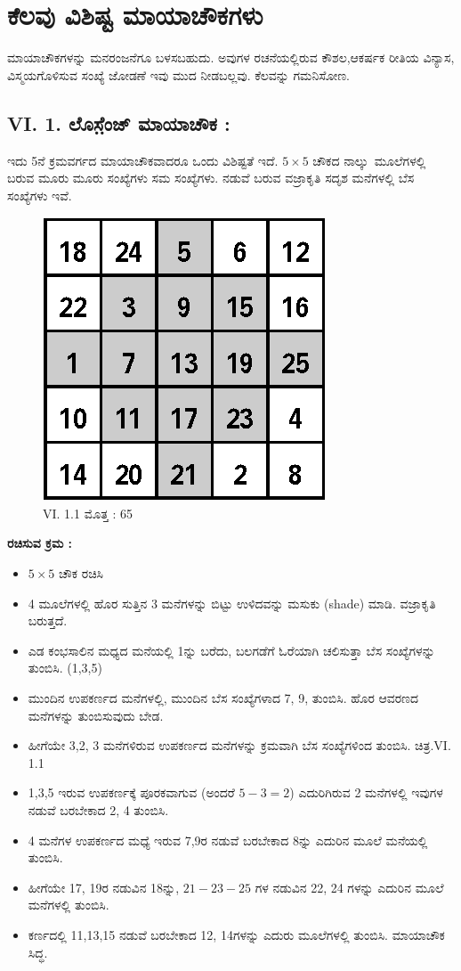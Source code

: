 
\chapter{ಕೆಲವು ವಿಶಿಷ್ಟ ಮಾಯಾಚೌಕಗಳು}

ಮಾಯಾಚೌಕಗಳನ್ನು ಮನರಂಜನೆಗೂ ಬಳಸಬಹುದು. ಅವುಗಳ ರಚನೆಯಲ್ಲಿರುವ ಕೌಶಲ,\break ಆಕರ್ಷಕ ರೀತಿಯ ವಿನ್ಯಾಸ, ವಿಸ್ಮಯಗೊಳಿಸುವ ಸಂಖ್ಯೆ ಜೋಡಣೆ ಇವು ಮುದ ನೀಡ\break ಬಲ್ಲವು. ಕೆಲವನ್ನು ಗಮನಿಸೋಣ.

\section*{VI. 1. ಲೊಸೆ಼ಂಜ್ ಮಾಯಾಚೌಕ :}

ಇದು 5ನೆ ಕ್ರಮವರ್ಗದ ಮಾಯಾಚೌಕವಾದರೂ ಒಂದು ವಿಶಿಷ್ಟತೆ ಇದೆ. $5 \times 5$ ಚೌಕದ \hbox{ನಾಲ್ಕು ಮೂಲೆಗಳಲ್ಲಿ} ಬರುವ ಮೂರು ಮೂರು ಸಂಖ್ಯೆಗಳು ಸಮ ಸಂಖ್ಯೆಗಳು. ನಡುವೆ ಬರುವ ವಜ್ರಾಕೃತಿ ಸದೃಶ ಮನೆಗಳಲ್ಲಿ ಬೆಸ ಸಂಖ್ಯೆಗಳು ಇವೆ.
\begin{figure}[H]
\includegraphics{src/figures/chap5/fig5-1.eps}
\caption*{VI. 1.1 ಮೊತ್ತ : 65}
\end{figure}

\noindent \textbf{ರಚಿಸುವ ಕ್ರಮ :}
\begin{itemize}
	\item $5 \times 5$ ಚೌಕ ರಚಿಸಿ
	\item 4 ಮೂಲೆಗಳಲ್ಲಿ ಹೊರ ಸುತ್ತಿನ 3 ಮನೆಗಳನ್ನು ಬಿಟ್ಟು ಉಳಿದವನ್ನು ಮಸುಕು (shade) ಮಾಡಿ. ವಜ್ರಾಕೃತಿ ಬರುತ್ತದೆ.
	\item ಎಡ ಕಂಭಸಾಲಿನ ಮಧ್ಯದ ಮನೆಯಲ್ಲಿ 1ನ್ನು ಬರೆದು, ಬಲಗಡೆಗೆ ಓರೆಯಾಗಿ ಚಲಿಸುತ್ತಾ ಬೆಸ ಸಂಖ್ಯೆಗಳನ್ನು ತುಂಬಿಸಿ. (1,3,5)
	\item ಮುಂದಿನ ಉಪಕರ್ಣದ ಮನೆಗಳಲ್ಲಿ, ಮುಂದಿನ ಬೆಸ ಸಂಖ್ಯೆಗಳಾದ 7, 9, ತುಂ\-ಬಿಸಿ. ಹೊರ ಆವರಣದ ಮನೆಗಳನ್ನು ತುಂಬಿಸುವುದು ಬೇಡ.
	\item ಹೀಗೆಯೇ 3,2, 3 ಮನೆಗಳಿರುವ ಉಪಕರ್ಣದ ಮನೆಗಳನ್ನು ಕ್ರಮವಾಗಿ ಬೆಸ ಸಂಖ್ಯೆ\-ಗಳಿಂದ ತುಂಬಿಸಿ. ಚಿತ್ರ.VI. 1.1
	\item 1,3,5 ಇರುವ ಉಪಕರ್ಣಕ್ಕೆ ಪೂರಕವಾಗುವ (ಅಂದರೆ $5-3=2$) ಎದುರಿಗಿರುವ 2 ಮನೆಗಳಲ್ಲಿ ಇವುಗಳ ನಡುವೆ ಬರಬೇಕಾದ 2, 4 ತುಂಬಿಸಿ.
	\item 4 ಮನೆಗಳ ಉಪಕರ್ಣದ ಮಧ್ಯೆ ಇರುವ 7,9ರ ನಡುವೆ ಬರಬೇಕಾದ 8ನ್ನು ಎದುರಿನ ಮೂಲೆ ಮನೆಯಲ್ಲಿ ತುಂಬಿಸಿ.
	\item ಹೀಗೆಯೇ 17, 19ರ ನಡುವಿನ 18ನ್ನು, $21-23-25$ ಗಳ ನಡುವಿನ 22, 24 ಗಳನ್ನು ಎದುರಿನ ಮೂಲೆ ಮನೆಗಳಲ್ಲಿ ತುಂಬಿಸಿ.
	\item ಕರ್ಣದಲ್ಲಿ 11,13,15 ನಡುವೆ ಬರಬೇಕಾದ 12, 14ಗಳನ್ನು ಎದುರು ಮೂಲೆಗಳಲ್ಲಿ ತುಂಬಿಸಿ. ಮಾಯಾಚೌಕ ಸಿದ್ಧ.
\end{itemize}

